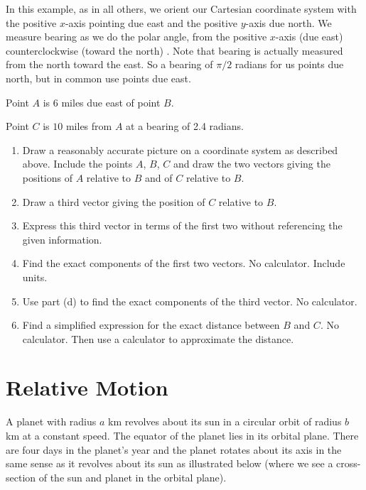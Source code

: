 \documentclass{ximera}
\begin{document}
\begin{example} \label{Ex:lferf303r0}
In this example, as in all others, we orient our Cartesian coordinate system with the positive $x$-axis pointing due east and the positive $y$-axis due north. We measure bearing as we do the polar angle, from the positive $x$-axis (due east) counterclockwise (toward the north) . Note that bearing is actually measured from the north toward the east. So a bearing of $\pi/2$ radians for us points due north, but in common use points due east.

Point $A$ is $6$ miles due east of point $B$. 

Point $C$ is $10$ miles from $A$ at a bearing of 2.4 radians.

\begin{enumerate}
\item Draw a reasonably accurate picture on a coordinate system as described above. Include the points $A$, $B$, $C$ and draw the two vectors giving the positions of $A$ relative to $B$ and of $C$ relative to $B$.

\item Draw a third vector giving the position of $C$ relative to $B$.

\item Express this third vector in terms of the first two without referencing the given information.

\item Find the exact components of the first two vectors. No calculator. Include units.

\item Use part (d) to find the exact components of the third vector. No calculator.

\item Find a simplified expression for the exact distance between $B$ and $C$. No calculator. Then use a calculator to approximate the distance.

\end{enumerate}
\end{example}


\section{Relative Motion}

\begin{example} \label{Ecr4322}
A planet with radius $a$ km revolves about its sun in a circular orbit of radius $b$ km at a constant speed. The equator of the planet lies in its orbital plane. There are four days in the planet's year and the planet rotates about its axis in the same sense as it revolves about its sun as illustrated below (where we see a cross-section of the sun and planet in the orbital plane).
\end{example}
\end{document}
